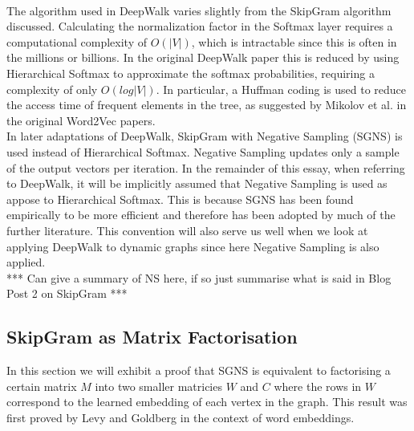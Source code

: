 \documentclass[a4paper]{article}
\begin{document}
\\
The algorithm used in DeepWalk varies slightly from the SkipGram algorithm
discussed. Calculating the normalization factor in the Softmax layer requires a
computational complexity of $O(|V|)$, which is intractable since this is often
in the millions or billions. In the original DeepWalk paper this is
reduced by using Hierarchical Softmax to approximate the softmax probabilities,
requiring a complexity of only $O(log|V|)$. In particular, a Huffman coding is
used to reduce the access time of frequent elements in the tree, as suggested by
Mikolov et al. in the original Word2Vec
papers.\cite{mikolov2013efficient,mikolov2013distributed}\\
In later adaptations of DeepWalk, SkipGram with Negative Sampling (SGNS) is used instead of
Hierarchical Softmax. Negative Sampling updates only a sample of the output
vectors per iteration. In the remainder of this essay, when referring to DeepWalk, it will be
implicitly assumed that Negative Sampling is used as appose to Hierarchical
Softmax. This is because SGNS has been found empirically to be more efficient
and therefore has been adopted by much of the further literature\cite{mikolov2013distributed}. This convention will also
serve us well when we look at applying DeepWalk to dynamic graphs since here
Negative Sampling is also applied.\\
*** Can give a summary of NS here, if so just summarise what is said in Blog
Post 2 on SkipGram ***\\
\subsection{SkipGram as Matrix Factorisation}
In this section we will exhibit a proof that SGNS is
equivalent to factorising a certain matrix $M$ into two smaller matricies $W$
and $C$ where the rows in $W$ correspond to the learned embedding of each vertex
in the graph. This result was first proved by Levy and
Goldberg\cite{levy&goldberg} in the context of word embeddings.\\
\end{document}
